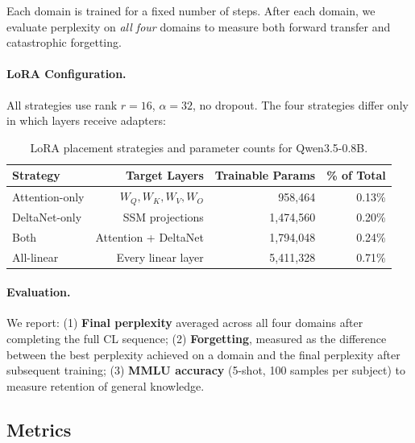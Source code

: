\documentclass{article}
\begin{document}
Each domain is trained for a fixed number of steps. After each domain, we evaluate perplexity on \emph{all four} domains to measure both forward transfer and catastrophic forgetting.

\paragraph{LoRA Configuration.}
All strategies use rank $r=16$, $\alpha=32$, no dropout. The four strategies differ only in which layers receive adapters:

\begin{table}[h]
\centering
\caption{LoRA placement strategies and parameter counts for Qwen3.5-0.8B.}
\label{tab:strategies}
\begin{tabular}{lrrr}
\toprule
\textbf{Strategy} & \textbf{Target Layers} & \textbf{Trainable Params} & \textbf{\% of Total} \\
\midrule
Attention-only & $W_Q, W_K, W_V, W_O$ & 958,464 & 0.13\% \\
DeltaNet-only & SSM projections & 1,474,560 & 0.20\% \\
Both & Attention + DeltaNet & 1,794,048\footnotemark & 0.24\% \\
All-linear & Every linear layer & 5,411,328 & 0.71\% \\
\bottomrule
\end{tabular}
\end{table}


\paragraph{Evaluation.}
We report: (1) \textbf{Final perplexity} averaged across all four domains after completing the full CL sequence; (2) \textbf{Forgetting}, measured as the difference between the best perplexity achieved on a domain and the final perplexity after subsequent training; (3) \textbf{MMLU accuracy} (5-shot, 100 samples per subject) to measure retention of general knowledge.

\subsection{Metrics}
\end{document}
